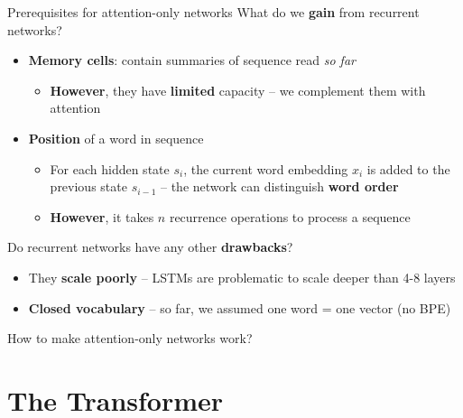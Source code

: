 \documentclass[12pt,aspectratio=169,handout]{beamer}
\begin{document}
\begin{frame}{Prerequisites for attention-only networks}
	What do we \textbf{gain} from recurrent networks?
	\pause

	\begin{itemize}
		\item \textbf{Memory cells}: contain summaries of sequence read \textit{so far}
		\pause
		\begin{itemize}
			\item \textbf{However}, they have \textbf{limited} capacity -- we complement them with attention
		\end{itemize}
		\pause
		\item \textbf{Position} of a word in sequence
		\pause
		\begin{itemize}
			\item For each hidden state $s_{i}$, the current word embedding $x_i$ is added to the previous state $s_{i-1}$ -- the network can distinguish \textbf{word order}
			\pause
			\item \textbf{However}, it takes $n$ recurrence operations to process a sequence 
		\end{itemize}

	\end{itemize}
	\pause

	Do recurrent networks have any other \textbf{drawbacks}?

	\pause

	\begin{itemize}
		\item They \textbf{scale poorly} -- LSTMs are problematic to scale deeper than 4-8 layers
		\item \textbf{Closed vocabulary} -- so far, we assumed one word = one vector (no BPE)
	\end{itemize}
	\pause

	How to make attention-only networks work?

\end{frame}

\section{The Transformer}
\end{document}
